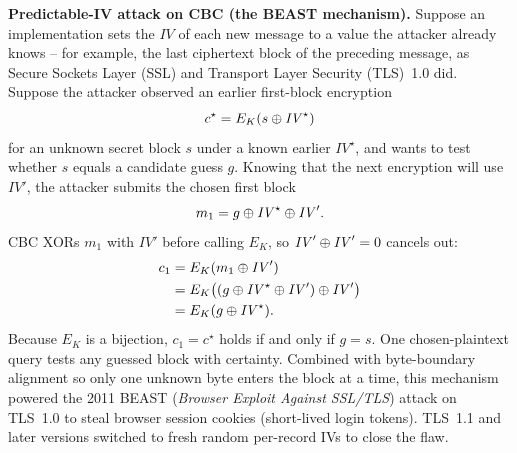 \begin{attackbox}
\textbf{Predictable-IV attack on CBC (the BEAST mechanism).} Suppose an implementation sets the $\mathit{IV}$ of each new message to a value the attacker already knows -- for example, the last ciphertext block of the preceding message, as Secure Sockets Layer (SSL) and Transport Layer Security (TLS)~1.0 did. Suppose the attacker observed an earlier first-block encryption
\[
c^\star = E_K(s \oplus \mathit{IV}^\star)
\]
for an unknown secret block $s$ under a known earlier $\mathit{IV}^\star$, and wants to test whether $s$ equals a candidate guess $g$. Knowing that the next encryption will use $\mathit{IV}'$, the attacker submits the chosen first block
\[
m_1 = g \oplus \mathit{IV}^\star \oplus \mathit{IV}'.
\]
CBC XORs $m_1$ with $\mathit{IV}'$ before calling $E_K$, so $\mathit{IV}' \oplus \mathit{IV}' = 0$ cancels out:
\begin{align*}
c_1 &= E_K(m_1 \oplus \mathit{IV}') \\
    &= E_K\big((g \oplus \mathit{IV}^\star \oplus \mathit{IV}') \oplus \mathit{IV}'\big) \\
    &= E_K(g \oplus \mathit{IV}^\star).
\end{align*}
Because $E_K$ is a bijection, $c_1 = c^\star$ holds if and only if $g = s$. One chosen-plaintext query tests any guessed block with certainty. Combined with byte-boundary alignment so only one unknown byte enters the block at a time, this mechanism powered the 2011 BEAST (\emph{Browser Exploit Against SSL/TLS}) attack on TLS~1.0 to steal browser session cookies (short-lived login tokens). TLS~1.1 and later versions switched to fresh random per-record IVs to close the flaw.
\end{attackbox}

